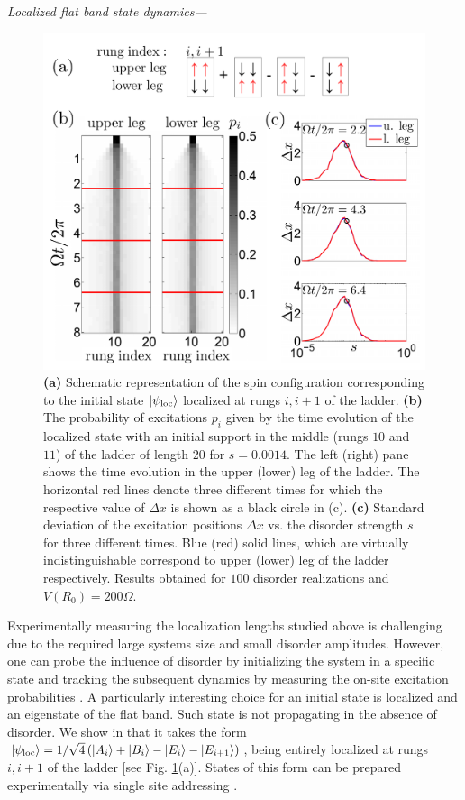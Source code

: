 \documentclass[prl,aps,twocolumn,showpacs,superscriptaddress,longbibliography]{revtex4-1}
\newcommand{\ran}{\right\rangle}
\newcommand{\ket}[1]{\left| #1 \ran}
\begin{document}
\emph{Localized flat band state dynamics---}
\begin{figure}
\includegraphics[width=\columnwidth]{Figure4.pdf}
\caption{\textbf{(a)} Schematic representation of the spin configuration corresponding to the initial state $\ket{\psi_{\rm loc}}$ localized at rungs $i,i+1$ of the ladder. \textbf{(b)} The probability of excitations $p_i$ given by the time evolution of the localized state with an initial support in the middle (rungs $10$ and $11$) of the ladder of length $20$ for $s=0.0014$. The left (right) pane shows the time evolution in the upper (lower) leg of the ladder. The horizontal red lines denote three different times for which the respective value of $\Delta x$ is shown as a black circle in (c). \textbf{(c)} Standard deviation of the excitation positions $\Delta x$ vs. the disorder strength $s$ for three different times. Blue (red) solid lines, which are virtually indistinguishable correspond to upper (lower) leg of the ladder respectively. Results obtained for $100$ disorder realizations and $V(R_0)=200\Omega$.}
\label{Fig:time evolution}
\end{figure}
Experimentally measuring the localization lengths studied above is challenging due to the required large systems size and small disorder amplitudes. However, one can probe the influence of disorder by initializing the system in a specific state and tracking the subsequent dynamics by measuring the on-site excitation probabilities \cite{Schauss_2015,Labuhn_2015,Bernien2017}. A particularly interesting choice for an initial state is localized and an eigenstate of the flat band. Such state is not propagating in the absence of disorder. We show in \cite{SM} that it takes the form $\ket{\psi_{\rm loc}} = 1/\sqrt{4} \left( \ket{A_i} + \ket{B_i} - \ket{E_i} - \ket{E_{i+1}} \right)$, being entirely localized at rungs $i,i+1$ of the ladder [see Fig. \ref{Fig:time evolution}(a)]. States of this form can be prepared experimentally via single site addressing \cite{SM}.
\end{document}
